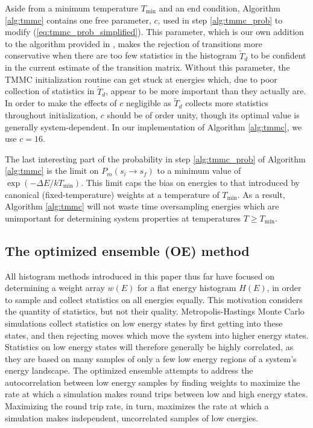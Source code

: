 \documentclass[11pt]{article}
\renewcommand{\t}{\text} %
\newcommand{\p}[1]{\left(#1\right)} %
\begin{document}
Aside from a minimum temperature $T_{\t{min}}$ and an end condition,
Algorithm \ref{alg:tmmc} contains one free parameter, $c$, used in
step \ref{alg:tmmc_prob} to modify (\ref{eq:tmmc_prob_simplified}).
This parameter, which is our own addition to the algorithm provided in
\cite{wang2002transition}, makes the rejection of transitions more
conservative when there are too few statistics in the histogram
$\tilde T_d$ to be confident in the current estimate of the transition
matrix. Without this parameter, the TMMC initialization routine can
get stuck at energies which, due to poor collection of statistics in
$\tilde T_d$, appear to be more important than they actually are. In
order to make the effects of $c$ negligible as $\tilde T_d$ collects
more statistics throughout initialization, $c$ should be of order
unity, though its optimal value is generally system-dependent. In our
implementation of Algorithm \ref{alg:tmmc}, we use $c=16$.

The last interesting part of the probability in step
\ref{alg:tmmc_prob} of Algorithm \ref{alg:tmmc} is the limit on
$P_m\p{s_i\to s_f}$ to a minimum value of $\exp\p{-\Delta
  E/kT_{\t{min}}}$. This limit caps the bias on energies to that
introduced by canonical (fixed-temperature) weights at a temperature
of $T_{\t{min}}$. As a result, Algorithm \ref{alg:tmmc} will not waste
time oversampling energies which are unimportant for determining
system properties at temperatures $T\ge T_{\t{min}}$.

\subsection{The optimized ensemble (OE) method}
\label{sec:optimized_ensemble}

All histogram methods introduced in this paper thus far have focused
on determining a weight array $w\p{E}$ for a flat energy histogram
$H\p{E}$, in order to sample and collect statistics on all energies
equally. This motivation considers the quantity of statistics, but not
their quality. Metropolis-Hastings Monte Carlo simulations collect
statistics on low energy states by first getting into these states,
and then rejecting moves which move the system into higher energy
states. Statistics on low energy states will therefore generally be
highly correlated, as they are based on many samples of only a few low
energy regions of a system's energy landscape. The optimized
ensemble\cite{trebst2004optimizing} attempts to address the
autocorrelation between low energy samples by finding weights to
maximize the rate at which a simulation makes round trips between low
and high energy states. Maximizing the round trip rate, in turn,
maximizes the rate at which a simulation makes independent,
uncorrelated samples of low energies.
\end{document}
